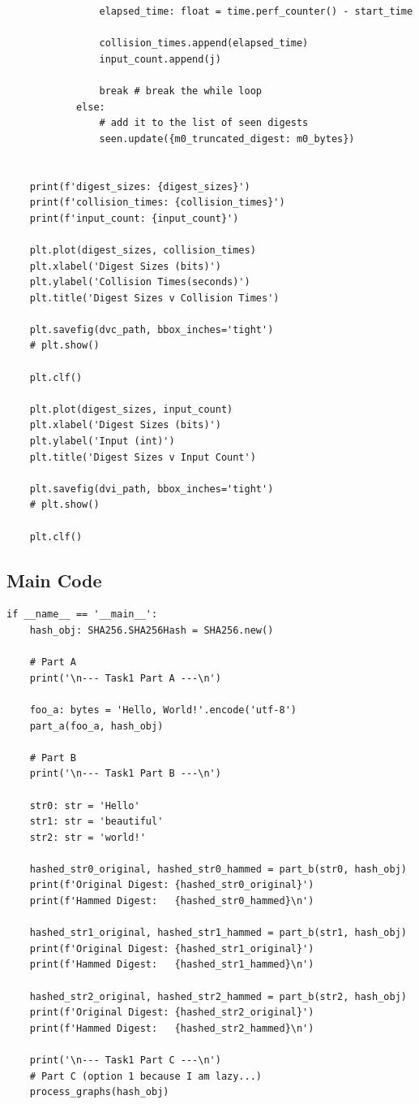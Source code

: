 \documentclass[11pt]{article}
\begin{document}
\begin{lstlisting}
                elapsed_time: float = time.perf_counter() - start_time

                collision_times.append(elapsed_time)
                input_count.append(j)

                break # break the while loop
            else:
                # add it to the list of seen digests
                seen.update({m0_truncated_digest: m0_bytes})


    print(f'digest_sizes: {digest_sizes}')
    print(f'collision_times: {collision_times}')
    print(f'input_count: {input_count}')

    plt.plot(digest_sizes, collision_times)
    plt.xlabel('Digest Sizes (bits)')
    plt.ylabel('Collision Times(seconds)')
    plt.title('Digest Sizes v Collision Times')

    plt.savefig(dvc_path, bbox_inches='tight')
    # plt.show()

    plt.clf()

    plt.plot(digest_sizes, input_count)
    plt.xlabel('Digest Sizes (bits)')
    plt.ylabel('Input (int)')
    plt.title('Digest Sizes v Input Count')

    plt.savefig(dvi_path, bbox_inches='tight')
    # plt.show()

    plt.clf()
\end{lstlisting}

\subsection*{Main Code}
\begin{lstlisting}
if __name__ == '__main__':
    hash_obj: SHA256.SHA256Hash = SHA256.new()

    # Part A
    print('\n--- Task1 Part A ---\n')

    foo_a: bytes = 'Hello, World!'.encode('utf-8')
    part_a(foo_a, hash_obj)

    # Part B 
    print('\n--- Task1 Part B ---\n')

    str0: str = 'Hello'
    str1: str = 'beautiful'
    str2: str = 'world!'

    hashed_str0_original, hashed_str0_hammed = part_b(str0, hash_obj)
    print(f'Original Digest: {hashed_str0_original}')
    print(f'Hammed Digest:   {hashed_str0_hammed}\n')

    hashed_str1_original, hashed_str1_hammed = part_b(str1, hash_obj)
    print(f'Original Digest: {hashed_str1_original}')
    print(f'Hammed Digest:   {hashed_str1_hammed}\n')

    hashed_str2_original, hashed_str2_hammed = part_b(str2, hash_obj)
    print(f'Original Digest: {hashed_str2_original}')
    print(f'Hammed Digest:   {hashed_str2_hammed}\n')

    print('\n--- Task1 Part C ---\n')
    # Part C (option 1 because I am lazy...)
    process_graphs(hash_obj)
\end{lstlisting}
\end{document}
